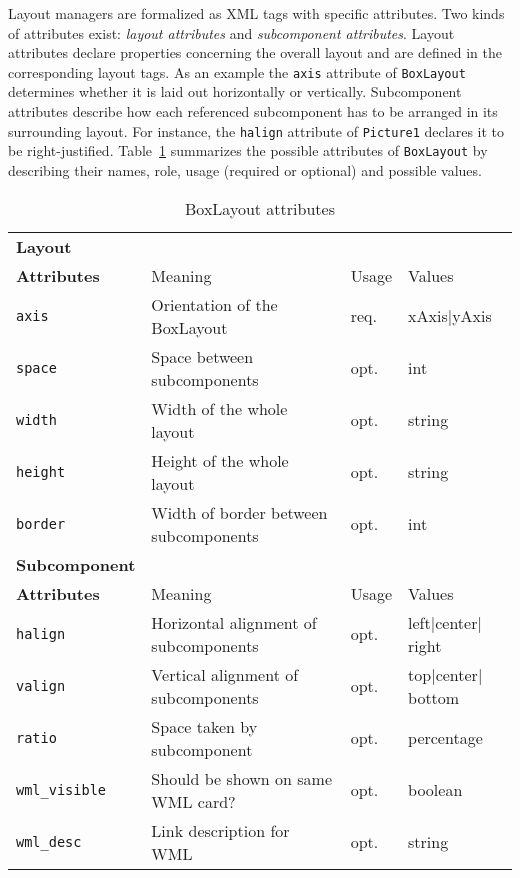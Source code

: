\documentclass[oribibl]{llncs}
\begin{document}
Layout managers are formalized as XML tags with specific attributes. 
Two kinds of attributes exist: \textit{layout attributes} and \textit{subcomponent attributes}. 
Layout attributes declare properties concerning the overall layout and are defined in the corresponding layout tags. As an example the \texttt{axis} attribute of \texttt{BoxLayout} determines whether it is laid out horizontally or vertically. 
Subcomponent attributes describe how each referenced subcomponent has to be arranged in its surrounding layout. 
For instance, the \texttt{halign} attribute of \texttt{Picture1} declares it to be right-justified.
Table~\ref{tab:BoxLayoutAttributes} summarizes the possible attributes of \texttt{BoxLayout} by describing their names, role, usage (required or optional) and possible values.

\begin{table}[h]
	\begin{center}
		\begin{tabular}{l l l l}
			\textbf{Layout} &  &  & \\
			\textbf{Attributes} & Meaning & Usage & Values\\
			\hline
			\texttt{axis} & Orientation of the BoxLayout & req. & xAxis$|$yAxis \\	
			\texttt{space} & Space between subcomponents & opt. & int\\	
			\texttt{width} & Width of the whole layout & opt. & string \\	
			\texttt{height} & Height of the whole layout & opt. & string \\													
			\texttt{border} & Width of border between subcomponents & opt. & int \\
			\hline			
			\textbf{Subcomponent} & &  &  \\
			\textbf{Attributes} & Meaning & Usage & Values\\
			\hline
			\texttt{halign} &  Horizontal alignment of subcomponents &  opt.&  left$|$center$|$right\\	
			\texttt{valign} & Vertical alignment of subcomponents &  opt.&  top$|$center$|$bottom\\	
			\texttt{ratio} & Space taken by subcomponent &  opt.&  percentage\\	
			\texttt{wml\_visible} & Should be shown on same WML card? &  opt.&  boolean\\													
			\texttt{wml\_desc} & Link description for WML &  opt.&  string\\	
			\hline						
		\end{tabular}
	\end{center}
	\caption{BoxLayout attributes}
	\label{tab:BoxLayoutAttributes}
\end{table}
\end{document}
